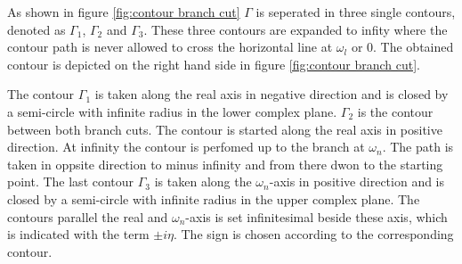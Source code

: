 %
As shown in figure \ref{fig:contour branch cut} $\Gamma$ is seperated in three single contours, denoted as $\Gamma_{1}$, $\Gamma_{2}$ and $\Gamma_{3}$.
These three contours are expanded to infity where the contour path is never allowed to cross the horizontal line at $\omega_{l}$ or $0$.
The obtained contour is depicted on the right hand side in figure \ref{fig:contour branch cut}.

The contour $\Gamma_{1}$ is taken along the real axis in negative direction and is closed by a semi-circle with infinite radius in the lower complex plane.
$\Gamma_{2}$ is the contour between both branch cuts.
The contour is started along the real axis in positive direction.
At infinity the contour is perfomed up to the branch at $\omega_{n}$.
The path is taken in oppsite direction to minus infinity and from there dwon to the starting point.
The last contour $\Gamma_{3}$ is taken along the $\omega_{n}$-axis in positive direction and is closed by a semi-circle with infinite radius in the upper complex plane.
The contours parallel the real and $\omega_{n}$-axis is set infinitesimal beside these axis, which is indicated with the term $\pm i\eta$.
The sign is chosen according to the corresponding contour.


